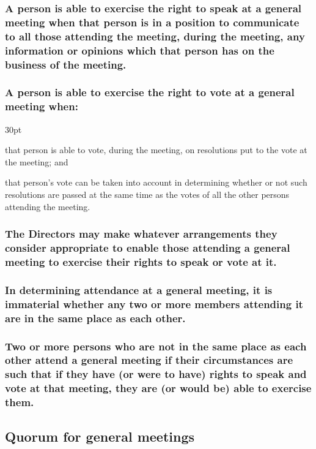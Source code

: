 \documentclass[12pt]{article}
\def\clauseindent{30pt}
\newenvironment{subindentpara}{\raggedright\begin{adjustwidth}{\clauseindent}{}\begin{hanginglist}}{\end{hanginglist}\end{adjustwidth}}
\begin{document}
\subsubsection[Specifics of attendance at general meetings]{A person is able to exercise the right to speak at a general meeting when that person is in a position to communicate to all those attending the meeting, during the meeting, any information or opinions which that person has on the business of the meeting.}
\subsubsection[Specifics of voting at general meetings]{A person is able to exercise the right to vote at a general meeting when:}
\begin{subindentpara}
    \item that person is able to vote, during the meeting, on resolutions put to the vote at the meeting; and
    \item that person's vote can be taken into account in determining whether or not such resolutions are passed at the same time as the votes of all the other persons attending the meeting.
\end{subindentpara}
\subsubsection[Directors may make any arrangements to enable participation]{The Directors may make whatever arrangements they consider appropriate to enable those attending a general meeting to exercise their rights to speak or vote at it.}
\subsubsection[Attendees' location at meetings is irrelevant]{In determining attendance at a general meeting, it is immaterial whether any two or more members attending it are in the same place as each other.}
\subsubsection[Attendees may exercise rights at any location]{Two or more persons who are not in the same place as each other attend a general meeting if their circumstances are such that if they have (or were to have) rights to speak and vote at that meeting, they are (or would be) able to exercise them.}

\subsection{Quorum for general meetings}
\end{document}
